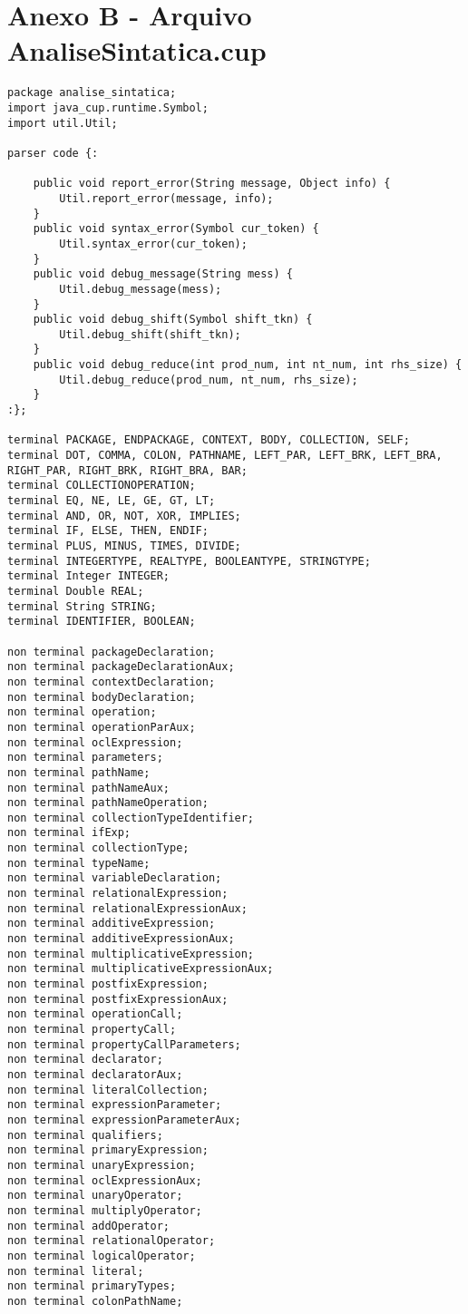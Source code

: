 \section{Anexo B - Arquivo AnaliseSintatica.cup}
\scriptsize
\begin{lstlisting}[frame=single, caption={AnaliseLexica.flex}]
package analise_sintatica;
import java_cup.runtime.Symbol;
import util.Util;

parser code {:
	
	public void report_error(String message, Object info) {
		Util.report_error(message, info);
	}
	public void syntax_error(Symbol cur_token) {
		Util.syntax_error(cur_token);
	}
	public void debug_message(String mess) {
		Util.debug_message(mess);
	}
	public void debug_shift(Symbol shift_tkn) {
		Util.debug_shift(shift_tkn);
	}
	public void debug_reduce(int prod_num, int nt_num, int rhs_size) {
		Util.debug_reduce(prod_num, nt_num, rhs_size);
	}
:};

terminal PACKAGE, ENDPACKAGE, CONTEXT, BODY, COLLECTION, SELF;
terminal DOT, COMMA, COLON, PATHNAME, LEFT_PAR, LEFT_BRK, LEFT_BRA, RIGHT_PAR, RIGHT_BRK, RIGHT_BRA, BAR;
terminal COLLECTIONOPERATION;
terminal EQ, NE, LE, GE, GT, LT;
terminal AND, OR, NOT, XOR, IMPLIES;
terminal IF, ELSE, THEN, ENDIF;
terminal PLUS, MINUS, TIMES, DIVIDE;
terminal INTEGERTYPE, REALTYPE, BOOLEANTYPE, STRINGTYPE;
terminal Integer INTEGER;
terminal Double REAL;
terminal String STRING;
terminal IDENTIFIER, BOOLEAN;

non terminal packageDeclaration;
non terminal packageDeclarationAux;
non terminal contextDeclaration;
non terminal bodyDeclaration;
non terminal operation;
non terminal operationParAux;
non terminal oclExpression;
non terminal parameters;
non terminal pathName;
non terminal pathNameAux;
non terminal pathNameOperation;
non terminal collectionTypeIdentifier;
non terminal ifExp;
non terminal collectionType;
non terminal typeName;
non terminal variableDeclaration;
non terminal relationalExpression;
non terminal relationalExpressionAux;
non terminal additiveExpression;
non terminal additiveExpressionAux;
non terminal multiplicativeExpression;
non terminal multiplicativeExpressionAux;
non terminal postfixExpression;
non terminal postfixExpressionAux;
non terminal operationCall;
non terminal propertyCall;
non terminal propertyCallParameters;
non terminal declarator;
non terminal declaratorAux;
non terminal literalCollection;
non terminal expressionParameter;
non terminal expressionParameterAux;
non terminal qualifiers;
non terminal primaryExpression;
non terminal unaryExpression;
non terminal oclExpressionAux;
non terminal unaryOperator;
non terminal multiplyOperator; 
non terminal addOperator;
non terminal relationalOperator;
non terminal logicalOperator;
non terminal literal;
non terminal primaryTypes;
non terminal colonPathName;
 

\end{lstlisting}

